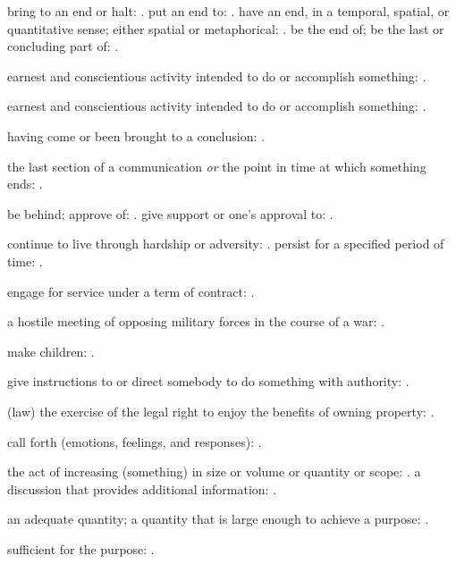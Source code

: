   bring to an end or halt: . put an end to: . have an end, in a temporal, spatial, or quantitative sense; either spatial or metaphorical: . be the end of; be the last or concluding part of: .

  earnest and conscientious activity intended to do or accomplish something: .

  earnest and conscientious activity intended to do or accomplish something: .

  having come or been brought to a conclusion: .

  the last section of a communication \textit{or} the point in time at which something ends: .

  be behind; approve of: . give support or one's approval to: .

  continue to live through hardship or adversity: . persist for a specified period of time: .

  engage for service under a term of contract: .

  a hostile meeting of opposing military forces in the course of a war: .

  make children: .

  give instructions to or direct somebody to do something with authority: .

  (law) the exercise of the legal right to enjoy the benefits of owning property: .

  call forth (emotions, feelings, and responses): .

  the act of increasing (something) in size or volume or quantity or scope: . a discussion that provides additional information: .

  an adequate quantity; a quantity that is large enough to achieve a purpose: .

  sufficient for the purpose: .

